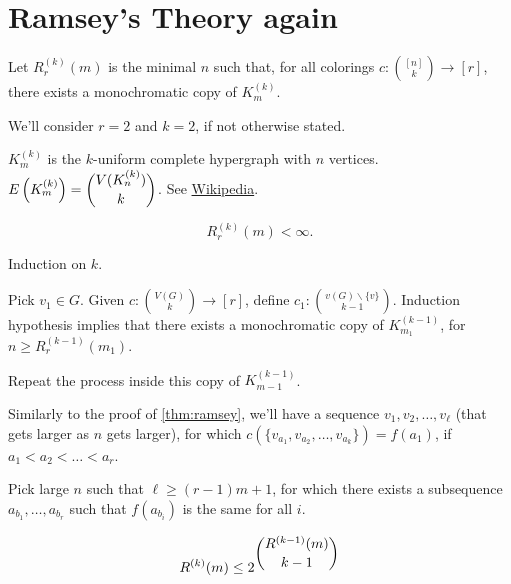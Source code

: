 \newpage
\section{Ramsey's Theory again}

\begin{defn}
	Let $R_r^{(k)}(m)$ is the minimal  $n$ such that, for all colorings $c \colon \binom{[n]}{k} \to [r]$, there exists a monochromatic copy of $K_{m}^{(k)}$.
\end{defn}

We'll consider $r = 2$ and $k = 2$, if not otherwise stated.

\begin{rem}
	$K_m^{(k)}$ is the $k$-uniform complete hypergraph with $n$ vertices. $E\left(K_m^{(k)}\right) = \dbinom{V(K_n^{(k)})}{k}$. See \href{https://en.wikipedia.org/wiki/Hypergraph}{Wikipedia}.
\end{rem}

\begin{thm}[Ramsey, 1930]
	\[
		R_r^{(k)} (m) < \infty.
	\]
\end{thm}

\begin{sk}
	Induction on $k$.

	Pick $v_1 \in G$. Given $c \colon \binom{V(G)}{k} \to [r]$, define $c_1: \binom{v(G)\backslash \{v\}}{k-1}$. Induction hypothesis implies that there exists a monochromatic copy of $K_{m_1}^{(k-1)}$, for $n \ge R_r^{(k-1)}(m_1)$. 

	Repeat the process inside this copy of $K_{m-1}^{(k-1)}$.

	Similarly to the proof of \cref{thm:ramsey}, we'll have a sequence $v_1, v_2, \dots, v_\ell$ (that gets larger as $n$ gets larger), for which $c(\{v_{a_1}, v_{a_2}, \dots, v_{a_k}\}) = f(a_1)$, if $a_1 < a_2 < \dots < a_r$.

	Pick large $n$ such that $\ell \ge (r-1)m + 1$, for which there exists a subsequence $a_{b_1}, \dots, a_{b_r}$ such that $f(a_{b_i})$ is the same for all $i$.
\end{sk}

\begin{thm}
	\[
		R^{(k)}(m) \le 2^{\dbinom{R^{{(k-1)}}(m)}{k-1}}
	\]
\end{thm}  

